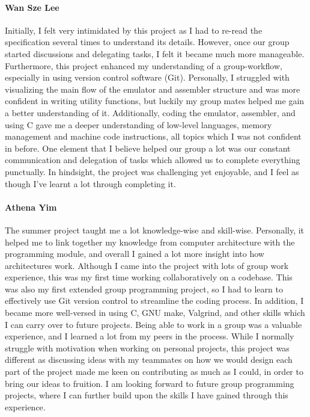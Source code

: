 \documentclass[a4paper,11pt]{article}
\begin{document}
\paragraph{Wan Sze Lee} Initially, I felt very intimidated by this project as I had to re-read the specification several times to understand its details. However, once our group started discussions and delegating tasks, I felt it became much more manageable. Furthermore, this project enhanced my understanding of a group-workflow, especially in using version control software (Git). Personally, I struggled with visualizing the main flow of the emulator and assembler structure and was more confident in writing utility functions, but luckily my group mates helped me gain a better understanding of it. Additionally, coding the emulator, assembler, and using C gave me a deeper understanding of low-level languages, memory management and machine code instructions, all topics which I was not confident in before. One element that I believe helped our group a lot was our constant communication and delegation of tasks which allowed us to complete everything punctually. In hindsight, the project was challenging yet enjoyable, and I feel as though I've learnt a lot through completing it.

\paragraph{Athena Yim} The summer project taught me a lot knowledge-wise and skill-wise. Personally, it helped me to link together my knowledge from computer architecture with the programming module, and overall I gained a lot more insight into how architectures work. Although I came into the project with lots of group work experience, this was my first time working collaboratively on a codebase. This was also my first extended group programming project, so I had to learn to effectively use Git version control to streamline the coding process. In addition, I became more well-versed in using C, GNU make, Valgrind, and other skills which I can carry over to future projects. Being able to work in a group was a valuable experience, and I learned a lot from my peers in the process. While I normally struggle with motivation when working on personal projects, this project was different as discussing ideas with my teammates on how we would design each part of the project made me keen on contributing as much as I could, in order to bring our ideas to fruition. I am looking forward to future group programming projects, where I can further build upon the skills I have gained through this experience.
\end{document}
